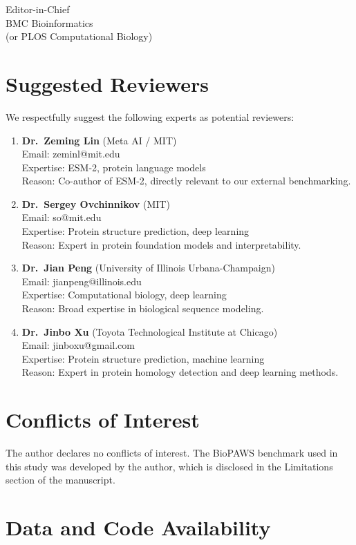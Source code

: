 \documentclass[11pt]{letter}
\begin{document}
\begin{letter}{Editor-in-Chief\\
BMC Bioinformatics\\
(or PLOS Computational Biology)}
\section*{Suggested Reviewers}

We respectfully suggest the following experts as potential reviewers:

\begin{enumerate}
\item \textbf{Dr.\ Zeming Lin} (Meta AI / MIT)\\
Email: zeminl@mit.edu\\
Expertise: ESM-2, protein language models\\
Reason: Co-author of ESM-2, directly relevant to our external benchmarking.

\item \textbf{Dr.\ Sergey Ovchinnikov} (MIT)\\
Email: so@mit.edu\\
Expertise: Protein structure prediction, deep learning\\
Reason: Expert in protein foundation models and interpretability.

\item \textbf{Dr.\ Jian Peng} (University of Illinois Urbana-Champaign)\\
Email: jianpeng@illinois.edu\\
Expertise: Computational biology, deep learning\\
Reason: Broad expertise in biological sequence modeling.

\item \textbf{Dr.\ Jinbo Xu} (Toyota Technological Institute at Chicago)\\
Email: jinboxu@gmail.com\\
Expertise: Protein structure prediction, machine learning\\
Reason: Expert in protein homology detection and deep learning methods.
\end{enumerate}

\section*{Conflicts of Interest}

The author declares no conflicts of interest. The BioPAWS benchmark used in this study was developed by the author, which is disclosed in the Limitations section of the manuscript.

\section*{Data and Code Availability}


\end{letter}
\end{document}
